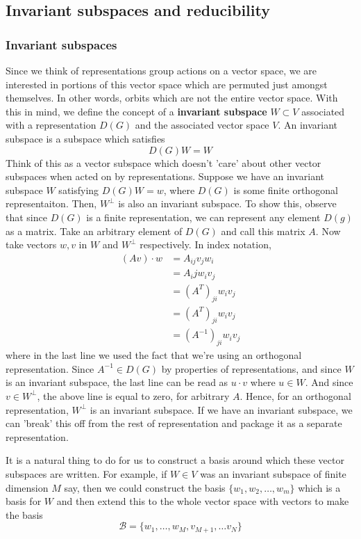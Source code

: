 \documentclass[11pt, oneside]{article}   	%
\theoremstyle{slanted}
\begin{document}
\subsection{Invariant subspaces and reducibility}  
\subsubsection{ Invariant subspaces} 
Since we think of representations group actions on a vector space, we are interested in portions of this vector space which are permuted just amongst themselves. In other words, orbits which are not the entire vector space. With this in mind, we define the concept of a \textbf{invariant subspace} $W \subset V$ associated with a representation $D( G) $ and the associated vector space $V$. An invariant subspace is a subspace which satisfies \[ D(G) W  = W \] 
Think of this as a vector subspace which doesn't 'care' about other vector subspaces when acted on by representations. Suppose we have an invariant subspace $W$ satisfying $D(G)W = w$, where $D(G)$ is some finite orthogonal representaiton. Then, $W^ { \perp} $ is also an invariant subspace. To show this, observe that since $D(G)$ is a finite representation, we can represent any element $D(g)$ as a matrix. Take an arbitrary element of $D(G)$ and call this matrix $A$. Now take vectors $w, v $ in $W$ and $W^{\perp} $ respectively. In index notation, 
\begin{align*} 
(A v ) \cdot w & = A_{ij} v_j w_i \\
&= A_ij w_i v_j \\
&= (A^T)_{ji} w_i v_j \\ 
&= (A^T)_{ji} w_i v_j \\ 
&= (A^{-1})_{ji} w_i v_j 
\end{align*} 
where in the last line we used the fact that we're using an orthogonal representation. 
Since $A^{-1} \in D(G)$ by properties of representations, and since $W$ is an invariant subspace, the last line can be read as $u \cdot v$ where $u \in W$. And since $ v \in W^{\perp}$, the above line is equal to zero, for arbitrary $A$. Hence, for an orthogonal representation, $W^{\perp} $ is an invariant subspace. 
If we have an invariant subspace, we can 'break' this off from the rest of representation and package it as a separate representation. 

It is a natural thing to do for us to construct a basis around which these vector subspaces are written. For example, if $W \in V $ was an invariant subspace of finite dimension $M$ say, then we could construct the basis $\{ w_1, w_2, \dots, w_m \} $ which is a basis for $W$ and then extend this to the whole vector space with vectors to make the basis \[ \mathcal{B} = \{ w_1, \dots, w_M, v_{ M+1} , \dots v_{N} \} \]  
\end{document}
